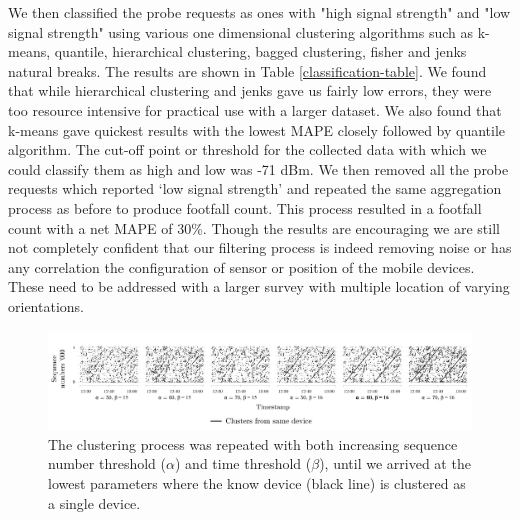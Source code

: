We then classified the probe requests as ones with "high signal strength" and
"low signal strength" using various one dimensional clustering algorithms such
as k-means, quantile, hierarchical clustering, bagged clustering, fisher and
jenks natural breaks.  The results are shown in Table
\ref{classification-table}.  We found that while hierarchical clustering and
jenks gave us fairly low errors, they were too resource intensive for practical
use with a larger dataset.  We also found that k-means gave quickest results
with the lowest MAPE closely followed by quantile algorithm.  The cut-off point
or threshold for the collected data with which we could classify them as high
and low was -71 dBm.  We then removed all the probe requests which reported `low
signal strength' and repeated the same aggregation process as before to produce
footfall count.  This process resulted in a footfall count with a net MAPE of
30\%.  Though the results are encouraging we are still not completely confident
that our filtering process is indeed removing noise or has any correlation the
configuration of sensor or position of the mobile devices.  These need to be
addressed with a larger survey with multiple location of varying orientations.

\begin{figure}
\begin{center}
\vspace{10pt}
\includegraphics [width=\linewidth,trim=10 30 10 75,clip]
	{images/pilot_clustering_params.png}
\caption{The clustering process was repeated with both increasing sequence
	number threshold ($\alpha$) and time threshold ($\beta$), until we arrived
	at the lowest parameters where the know device (black line) is clustered as
	a single device.}
\label{pilot_clustering_params}
\end{center}
\end{figure}

